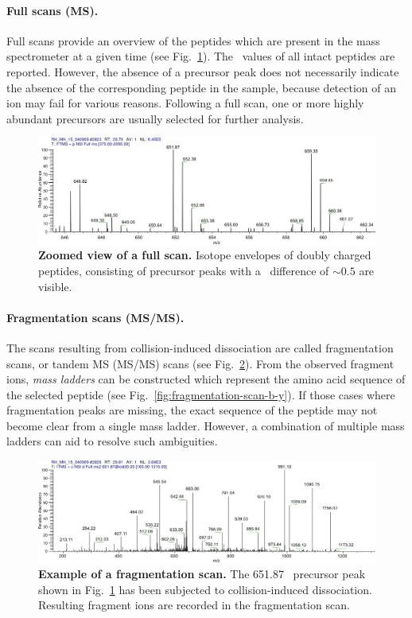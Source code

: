 \paragraph{Full scans (MS).}

Full scans provide an overview of the peptides which are present in the
mass spectrometer at a given time (see Fig.~\ref{fig:full-scan}).
The \mz~values of all intact peptides are reported.
However, the absence of a precursor peak does not necessarily indicate the
absence of the corresponding peptide in the sample, because detection of
an ion may fail for various reasons.
Following a full scan, one or more highly abundant precursors are usually
selected for further analysis.

\begin{figure}
\includegraphics[width=\textwidth]{figures/ms1-scan.jpg}
\caption{
{\bf Zoomed view of a full scan.}
Isotope envelopes of doubly charged peptides, consisting of precursor
peaks with a \mz~difference of $\sim0.5$ are visible.
}
\label{fig:full-scan}
\end{figure}

\paragraph{Fragmentation scans (MS/MS).}

The scans resulting from collision-induced dissociation are called 
fragmentation scans, or tandem MS (MS/MS) scans (see Fig.~\ref{fig:fragmentation-scan}).
From the observed fragment ions, {\em mass ladders} can be constructed which
represent the amino acid sequence of the selected peptide (see Fig.~\ref{fig:fragmentation-scan-b-y}). 
If those cases where fragmentation peaks are missing, the exact sequence of the 
peptide may not become clear from a single mass ladder.
However, a combination of multiple mass ladders can aid to resolve such 
ambiguities.

\begin{figure}
\includegraphics[width=\textwidth]{figures/ms2-scan.jpg}
\caption{
{\bf Example of a fragmentation scan.} 
The 651.87 \mz~precursor peak shown in Fig.~\ref{fig:full-scan} has been
subjected to collision-induced dissociation.
Resulting fragment ions are recorded in the fragmentation scan.
}
\label{fig:fragmentation-scan}
\end{figure}

